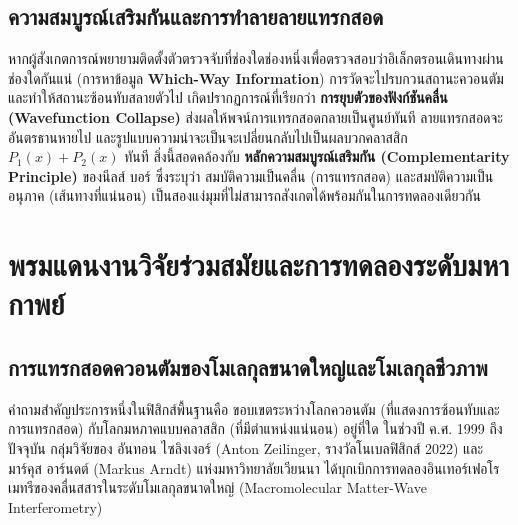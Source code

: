 \subsection{ความสมบูรณ์เสริมกันและการทำลายลายแทรกสอด}

หากผู้สังเกตการณ์พยายามติดตั้งตัวตรวจจับที่ช่องใดช่องหนึ่งเพื่อตรวจสอบว่าอิเล็กตรอนเดินทางผ่านช่องใดกันแน่ (การหาข้อมูล \textbf{Which-Way Information}) การวัดจะไปรบกวนสถานะควอนตัมและทำให้สถานะซ้อนทับสลายตัวไป เกิดปรากฏการณ์ที่เรียกว่า \textbf{การยุบตัวของฟังก์ชันคลื่น (Wavefunction Collapse)} ส่งผลให้พจน์การแทรกสอดกลายเป็นศูนย์ทันที ลายแทรกสอดจะอันตรธานหายไป และรูปแบบความน่าจะเป็นจะเปลี่ยนกลับไปเป็นผลบวกคลาสสิก $P_1(x) + P_2(x)$ ทันที สิ่งนี้สอดคล้องกับ \textbf{หลักความสมบูรณ์เสริมกัน (Complementarity Principle)} ของนีลส์ บอร์ ซึ่งระบุว่า สมบัติความเป็นคลื่น (การแทรกสอด) และสมบัติความเป็นอนุภาค (เส้นทางที่แน่นอน) เป็นสองแง่มุมที่ไม่สามารถสังเกตได้พร้อมกันในการทดลองเดียวกัน

\section{พรมแดนงานวิจัยร่วมสมัยและการทดลองระดับมหากาพย์}

\subsection{การแทรกสอดควอนตัมของโมเลกุลขนาดใหญ่และโมเลกุลชีวภาพ}

คำถามสำคัญประการหนึ่งในฟิสิกส์พื้นฐานคือ ขอบเขตระหว่างโลกควอนตัม (ที่แสดงการซ้อนทับและการแทรกสอด) กับโลกมหภาคแบบคลาสสิก (ที่มีตำแหน่งแน่นอน) อยู่ที่ใด ในช่วงปี ค.ศ. 1999 ถึงปัจจุบัน กลุ่มวิจัยของ อันทอน ไซลิงเงอร์ (Anton Zeilinger, รางวัลโนเบลฟิสิกส์ 2022) และ มาร์คุส อาร์นดต์ (Markus Arndt) แห่งมหาวิทยาลัยเวียนนา ได้บุกเบิกการทดลองอินเทอร์เฟอโรเมทรีของคลื่นสสารในระดับโมเลกุลขนาดใหญ่ (Macromolecular Matter-Wave Interferometry)


